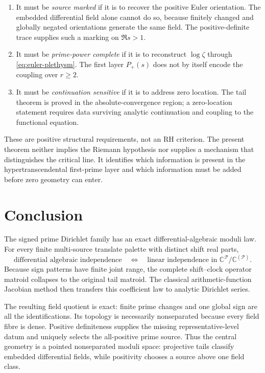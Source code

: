\documentclass[11pt]{article}
\theoremstyle{definition}
\theoremstyle{remark}
\newcommand{\C}{\mathbb C}
\newcommand{\cP}{\mathcal P}
\begin{document}
\begin{enumerate}[label=\textup{(\arabic*)},leftmargin=2.3em]
  \item It must be \emph{source marked} if it is to recover the positive Euler orientation.  The
  embedded differential field alone cannot do so, because finitely changed and globally negated
  orientations generate the same field.  The positive-definite trace supplies such a marking on
  \(\Re s>1\).
  \item It must be \emph{prime-power complete} if it is to reconstruct \(\log\zeta\) through
  \eqref{eq:euler-plethysm}.  The first layer \(P_+(s)\) does not by itself encode the coupling
  over \(r\geq2\).
  \item It must be \emph{continuation sensitive} if it is to address zero location.  The tail
  theorem is proved in the absolute-convergence region; a zero-location statement requires data
  surviving analytic continuation and coupling to the functional equation.
\end{enumerate}

These are positive structural requirements, not an RH criterion.  The present theorem neither
implies the Riemann hypothesis nor supplies a mechanism that distinguishes the critical line.
It identifies which information is present in the hypertranscendental first-prime layer and which
information must be added before zero geometry can enter.

\section{Conclusion}

The signed prime Dirichlet family has an exact differential-algebraic moduli law.  For every finite
multi-source translate palette with distinct shift real parts,
\[
  \text{differential algebraic independence}
  \quad\Longleftrightarrow\quad
  \text{linear independence in }
  \C^{\cP}/\C^{(\cP)}.
\]
Because sign patterns have finite joint range, the complete shift--clock operator matroid collapses
to the original tail matroid.  The classical arithmetic-function Jacobian method then transfers
this coefficient law to analytic Dirichlet series.

The resulting field quotient is exact: finite prime changes and one global sign are all the
identifications.  Its topology is necessarily nonseparated because every field fibre is dense.
Positive definiteness supplies the missing representative-level datum and uniquely selects the
all-positive prime source.  Thus the central geometry is a pointed nonseparated moduli space:
projective tails classify embedded differential fields, while positivity chooses a source above
one field class.
\end{document}
